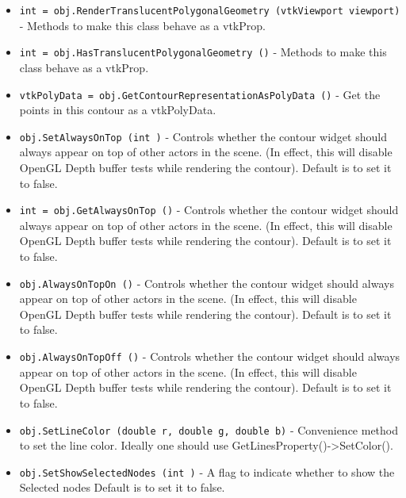 \begin{itemize}
\item  \verb|int = obj.RenderTranslucentPolygonalGeometry (vtkViewport viewport)| -  Methods to make this class behave as a vtkProp.

\item  \verb|int = obj.HasTranslucentPolygonalGeometry ()| -  Methods to make this class behave as a vtkProp.

\item  \verb|vtkPolyData = obj.GetContourRepresentationAsPolyData ()| -  Get the points in this contour as a vtkPolyData. 

\item  \verb|obj.SetAlwaysOnTop (int )| -  Controls whether the contour widget should always appear on top
 of other actors in the scene. (In effect, this will disable OpenGL
 Depth buffer tests while rendering the contour).
 Default is to set it to false.

\item  \verb|int = obj.GetAlwaysOnTop ()| -  Controls whether the contour widget should always appear on top
 of other actors in the scene. (In effect, this will disable OpenGL
 Depth buffer tests while rendering the contour).
 Default is to set it to false.

\item  \verb|obj.AlwaysOnTopOn ()| -  Controls whether the contour widget should always appear on top
 of other actors in the scene. (In effect, this will disable OpenGL
 Depth buffer tests while rendering the contour).
 Default is to set it to false.

\item  \verb|obj.AlwaysOnTopOff ()| -  Controls whether the contour widget should always appear on top
 of other actors in the scene. (In effect, this will disable OpenGL
 Depth buffer tests while rendering the contour).
 Default is to set it to false.

\item  \verb|obj.SetLineColor (double r, double g, double b)| -  Convenience method to set the line color.
 Ideally one should use GetLinesProperty()->SetColor().

\item  \verb|obj.SetShowSelectedNodes (int )| -  A flag to indicate whether to show the Selected nodes
 Default is to set it to false.

\end{itemize}
